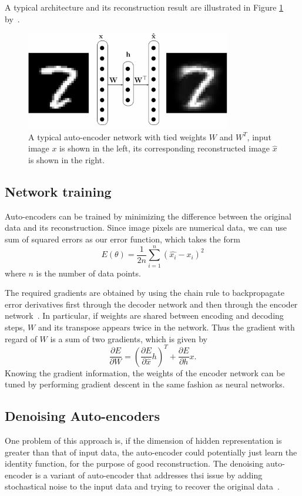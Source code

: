 A typical architecture and its reconstruction result are illustrated in Figure \ref{aefig} by~\cite{lemme2010efficient}.  
\begin{figure}[h!]
  \centering
  \label{aefig}
  \includegraphics[width=0.8\textwidth]{pics/ae.png}
  \caption{ A typical auto-encoder network with tied weights $W$ and $W^T$, input image $x$ is shown in the left, its corresponding reconstructed image $\hat{x}$ is shown in the right.}
\end{figure}

\subsection{Network training}
\label{AE training}
Auto-encoders can be trained by minimizing the difference between the original data and its reconstruction. Since image pixels are numerical data, we can use sum of squared errors as our error function, which takes the form
\begin{equation}
	\label{aeerr}
	E(\theta) = \frac{1}{2n}\sum\limits_{i=1}^n(\hat{x_i}-{x_i})^2
\end{equation}
where $n$ is the number of data points.

The required gradients are obtained by using the chain rule to backpropagate error derivatives first through the decoder network and then through the encoder network~\cite{hinton2006reducing}. In particular, if weights are shared between encoding and decoding steps, $W$ and its transpose appears twice in the network. Thus the gradient with regard of $W$ is a sum of two gradients, which is given by
\begin{equation}
	\frac{\partial E}{\partial W} = (\frac{\partial E}{\partial \hat{x}}h)^T +  \frac{\partial E}{\partial h}x.
\end{equation}
Knowing the gradient information, the weights of the encoder network can be tuned by performing gradient descent in the same fashion as neural networks.

\subsection{Denoising Auto-encoders}
\label{Denoising Auto-encoders}
One problem of this approach is, if the dimension of hidden representation is greater than that of input data, the auto-encoder could potentially just learn the identity function, for the purpose of good reconstruction. 
The denoising auto-encoder is a variant of auto-encoder that addresses thsi issue by adding stochastical noise to the input data and trying to recover the original data~\cite{bengio2009learning}. 


